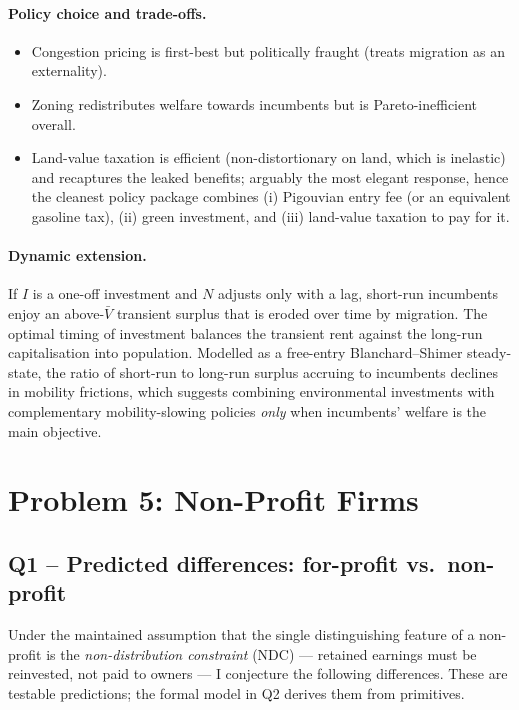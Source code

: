 \documentclass[11pt,a4paper]{article}
\begin{document}
\paragraph{Policy choice and trade-offs.}
\begin{itemize}[leftmargin=*,itemsep=2pt]
    \item Congestion pricing is first-best but politically fraught (treats migration as an externality).
    \item Zoning redistributes welfare towards incumbents but is Pareto-inefficient overall.
    \item Land-value taxation is efficient (non-distortionary on land, which is inelastic) and recaptures the leaked benefits; arguably the most elegant response, hence the cleanest policy package combines (i) Pigouvian entry fee (or an equivalent gasoline tax), (ii) green investment, and (iii) land-value taxation to pay for it.
\end{itemize}

\paragraph{Dynamic extension.}
If $I$ is a one-off investment and $N$ adjusts only with a lag, short-run incumbents enjoy an above-$\bar V$ transient surplus that is eroded over time by migration. The optimal timing of investment balances the transient rent against the long-run capitalisation into population. Modelled as a free-entry Blanchard--Shimer steady-state, the ratio of short-run to long-run surplus accruing to incumbents declines in mobility frictions, which suggests combining environmental investments with complementary mobility-slowing policies \emph{only} when incumbents' welfare is the main objective.

\section*{Problem 5: Non-Profit Firms}

\subsection*{Q1 -- Predicted differences: for-profit vs.\ non-profit}

Under the maintained assumption that the single distinguishing feature of a non-profit is the \emph{non-distribution constraint} (NDC) --- retained earnings must be reinvested, not paid to owners --- I conjecture the following differences. These are testable predictions; the formal model in Q2 derives them from primitives.
\end{document}
